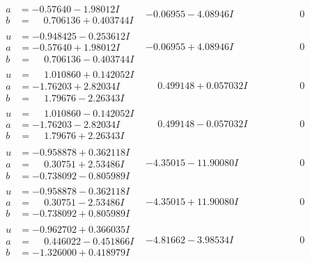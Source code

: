 \documentclass[1p]{elsarticle_modified}
\theoremstyle{definition}
\begin{document}
$$\begin{array}{c|c|c}
\begin{aligned}
a &= -0.57640 - 1.98012 I \\
b &= \phantom{-}0.706136 + 0.403744 I\end{aligned}
 & -0.06955 - 4.08946 I & \phantom{-0.000000 } 0 \\ \hline\begin{aligned}
u &= -0.948425 - 0.253612 I \\
a &= -0.57640 + 1.98012 I \\
b &= \phantom{-}0.706136 - 0.403744 I\end{aligned}
 & -0.06955 + 4.08946 I & \phantom{-0.000000 } 0 \\ \hline\begin{aligned}
u &= \phantom{-}1.010860 + 0.142052 I \\
a &= -1.76203 + 2.82034 I \\
b &= \phantom{-}1.79676 - 2.26343 I\end{aligned}
 & \phantom{-}0.499148 + 0.057032 I & \phantom{-0.000000 } 0 \\ \hline\begin{aligned}
u &= \phantom{-}1.010860 - 0.142052 I \\
a &= -1.76203 - 2.82034 I \\
b &= \phantom{-}1.79676 + 2.26343 I\end{aligned}
 & \phantom{-}0.499148 - 0.057032 I & \phantom{-0.000000 } 0 \\ \hline\begin{aligned}
u &= -0.958878 + 0.362118 I \\
a &= \phantom{-}0.30751 + 2.53486 I \\
b &= -0.738092 - 0.805989 I\end{aligned}
 & -4.35015 - 11.90080 I & \phantom{-0.000000 } 0 \\ \hline\begin{aligned}
u &= -0.958878 - 0.362118 I \\
a &= \phantom{-}0.30751 - 2.53486 I \\
b &= -0.738092 + 0.805989 I\end{aligned}
 & -4.35015 + 11.90080 I & \phantom{-0.000000 } 0 \\ \hline\begin{aligned}
u &= -0.962702 + 0.366035 I \\
a &= \phantom{-}0.446022 - 0.451866 I \\
b &= -1.326000 + 0.418979 I\end{aligned}
 & -4.81662 - 3.98534 I & \phantom{-0.000000 } 0 \\ \hline\begin{aligned}

\end{aligned}
\end{array}$$
\end{document}
